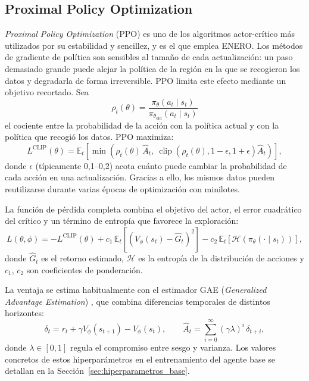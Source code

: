 \subsection{Proximal Policy Optimization}\label{sec:ppo}

\textit{Proximal Policy Optimization} (PPO) \cite{schulman2017proximal} es uno de los algoritmos actor-crítico más utilizados por su estabilidad y sencillez, y es el que emplea ENERO. Los métodos de gradiente de política son sensibles al tamaño de cada actualización: un paso demasiado grande puede alejar la política de la región en la que se recogieron los datos y degradarla de forma irreversible. PPO limita este efecto mediante un objetivo recortado. Sea
\begin{equation}
	\rho_t(\theta) = \frac{\pi_\theta(a_t \mid s_t)}{\pi_{\theta_{\text{old}}}(a_t \mid s_t)}
\end{equation}
el cociente entre la probabilidad de la acción con la política actual y con la política que recogió los datos. PPO maximiza:
\begin{equation}\label{eq:ppo_clip}
	L^{\text{CLIP}}(\theta) = \mathbb{E}_t\left[ \min\left( \rho_t(\theta)\,\hat{A}_t,\ \operatorname{clip}\left(\rho_t(\theta), 1-\epsilon, 1+\epsilon\right)\hat{A}_t \right) \right],
\end{equation}
donde $\epsilon$ (típicamente 0,1--0,2) acota cuánto puede cambiar la probabilidad de cada acción en una actualización. Gracias a ello, los mismos datos pueden reutilizarse durante varias épocas de optimización con minilotes.

La función de pérdida completa combina el objetivo del actor, el error cuadrático del crítico y un término de entropía que favorece la exploración:
\begin{equation}\label{eq:ppo_loss}
	L(\theta, \phi) = -L^{\text{CLIP}}(\theta) + c_1\, \mathbb{E}_t\left[ \left(V_\phi(s_t) - \hat{G}_t\right)^2 \right] - c_2\, \mathbb{E}_t\left[ \mathcal{H}\left(\pi_\theta(\cdot \mid s_t)\right) \right],
\end{equation}
donde $\hat{G}_t$ es el retorno estimado, $\mathcal{H}$ es la entropía de la distribución de acciones y $c_1$, $c_2$ son coeficientes de ponderación.

La ventaja se estima habitualmente con el estimador GAE (\textit{Generalized Advantage Estimation}) \cite{schulman2016high}, que combina diferencias temporales de distintos horizontes:
\begin{equation}\label{eq:gae}
	\delta_t = r_t + \gamma V_\phi(s_{t+1}) - V_\phi(s_t), \qquad \hat{A}_t = \sum_{i=0}^{\infty} (\gamma\lambda)^{i}\, \delta_{t+i},
\end{equation}
donde $\lambda \in [0,1]$ regula el compromiso entre sesgo y varianza. Los valores concretos de estos hiperparámetros en el entrenamiento del agente base se detallan en la Sección~\ref{sec:hiperparametros_base}.

